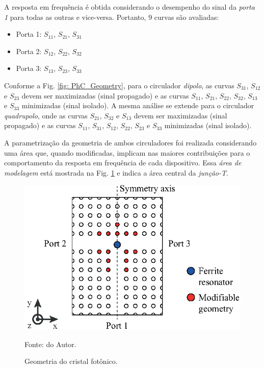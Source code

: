 A resposta em frequência é obtida considerando o desempenho do sinal da \textit{porta 1} para todas as outras e vice-versa. Portanto, $9$ curvas são avaliadas:

\begin{itemize}
    \item Porta 1: $S_{11}$, $S_{21}$, $S_{31}$
    \item Porta 2: $S_{12}$, $S_{22}$, $S_{32}$
    \item Porta 3: $S_{13}$, $S_{23}$, $S_{33}$
\end{itemize}

Conforme a Fig. \ref{fig: PhC_Geometry}, para o circulador \textit{dipolo}, as curvas $S_{31}$, $S_{12}$ e $S_{23}$ devem ser maximizadas (sinal propagado) e as curvas $S_{11}$, $S_{21}$, $S_{22}$, $S_{32}$, $S_{13}$ e $S_{33}$ minimizadas (sinal isolado). A mesma análise se extende para o circulador \textit{quadrupolo}, onde as curvas $S_{21}$, $S_{32}$ e $S_{13}$ devem ser maximizadas (sinal propagado) e as curvas $S_{11}$, $S_{31}$, $S_{12}$, $S_{22}$, $S_{23}$ e $S_{33}$ minimizadas (sinal isolado).

A parametrização da geometria de ambos circuladores foi realizada considerando uma área que, quando modificadas, implicam nas maiores contribuições para o comportamento da resposta em frequência de cada dispositivo. Essa \textit{área de modelagem} está mostrada na Fig. \ref{fig: PhotonicCrystal} e indica a área central da \textit{junção-T}.

\begin{figure}[H]
    \centering
    \includegraphics{04-Figuras/PhotonicCrystal.eps}
    \caption{Geometria do cristal fotônico.} \par
    Fonte: do Autor.
    \label{fig: PhotonicCrystal}
\end{figure}

